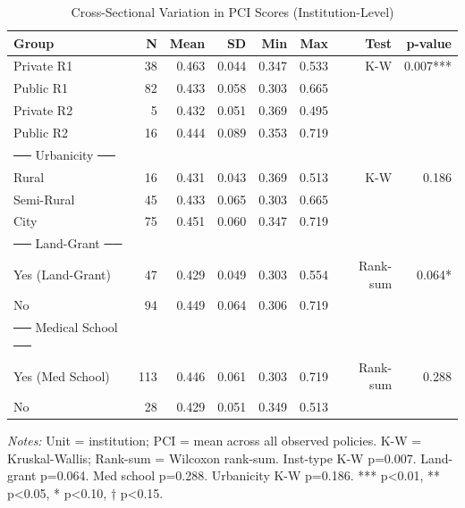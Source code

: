 \begin{table}[H]
\centering
\caption{Cross-Sectional Variation in PCI Scores (Institution-Level)}
\label{tab:table6_crosssectional}
\begin{threeparttable}
\small
\begin{tabular}{lrrrrrrr}
\toprule
\textbf{Group} & \textbf{N} & \textbf{Mean} & \textbf{SD} & \textbf{Min} & \textbf{Max} & \textbf{Test} & \textbf{p-value} \\
\midrule
  Private R1 & 38 & 0.463 & 0.044 & 0.347 & 0.533 & K-W & 0.007*** \\
  Public R1 & 82 & 0.433 & 0.058 & 0.303 & 0.665 &  &  \\
  Private R2 & 5 & 0.432 & 0.051 & 0.369 & 0.495 &  &  \\
  Public R2 & 16 & 0.444 & 0.089 & 0.353 & 0.719 &  &  \\
── Urbanicity ── &  &  &  &  &  &  &  \\
  Rural & 16 & 0.431 & 0.043 & 0.369 & 0.513 & K-W & 0.186 \\
  Semi-Rural & 45 & 0.433 & 0.065 & 0.303 & 0.665 &  &  \\
  City & 75 & 0.451 & 0.060 & 0.347 & 0.719 &  &  \\
── Land-Grant ── &  &  &  &  &  &  &  \\
  Yes (Land-Grant) & 47 & 0.429 & 0.049 & 0.303 & 0.554 & Rank-sum & 0.064* \\
  No & 94 & 0.449 & 0.064 & 0.306 & 0.719 &  &  \\
── Medical School ── &  &  &  &  &  &  &  \\
  Yes (Med School) & 113 & 0.446 & 0.061 & 0.303 & 0.719 & Rank-sum & 0.288 \\
  No & 28 & 0.429 & 0.051 & 0.349 & 0.513 &  &  \\
\bottomrule
\end{tabular}
\begin{tablenotes}\small
\item \textit{Notes:} Unit = institution; PCI = mean across all observed policies. K-W = Kruskal-Wallis; Rank-sum = Wilcoxon rank-sum. Inst-type K-W p=0.007. Land-grant p=0.064. Med school p=0.288. Urbanicity K-W p=0.186. *** p<0.01, ** p<0.05, * p<0.10, † p<0.15.
\end{tablenotes}
\end{threeparttable}
\end{table}